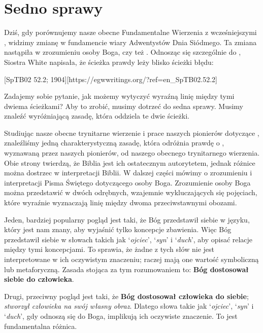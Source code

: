 \chapter{Sedno sprawy}

Dziś, gdy porównujemy nasze obecne Fundamentalne Wierzenia z wcześniejszymi , widzimy zmianę w fundamencie wiary Adwentystów Dnia Siódmego. Ta zmiana nastąpiła w zrozumieniu osoby Boga, czy też . Odnosząc się szczególnie do , Siostra White napisała, że ścieżka prawdy leży blisko ścieżki błędu:

[SpTB02 52.2; 1904][https://egwwritings.org/?ref=en\_SpTB02.52.2]

Zadajemy sobie pytanie, jak możemy wytyczyć wyraźną linię między tymi dwiema ścieżkami? Aby to zrobić, musimy dotrzeć do sedna sprawy. Musimy znaleźć wyróżniającą zasadę, która oddziela te dwie ścieżki.

Studiując nasze obecne trynitarne wierzenie i prace naszych pionierów dotyczące , znaleźliśmy jedną charakterystyczną zasadę, która odróżnia prawdę o , wyznawaną przez naszych pionierów, od naszego obecnego trynitarnego wierzenia. Obie strony twierdzą, że Biblia jest ich ostatecznym autorytetem, jednak różnice można dostrzec w interpretacji Biblii. W dalszej części mówimy o zrozumieniu i interpretacji Pisma Świętego dotyczącego osoby Boga. Zrozumienie osoby Boga można przedstawić w dwóch odrębnych, wzajemnie wykluczających się pojęciach, które wyraźnie wyznaczają linię między dwoma przeciwstawnymi obozami.

Jeden, bardziej popularny pogląd jest taki, że Bóg przedstawił siebie w języku, który jest nam znany, aby wyjaśnić tylko koncepcje zbawienia. Więc Bóg przedstawił siebie w słowach takich jak ‘\textit{ojciec}’, ‘\textit{syn}’ i ‘\textit{duch}’, aby opisać relacje między tymi koncepcjami. To sprawia, że żadne z tych słów nie jest interpretowane w ich oczywistym znaczeniu; raczej mają one wartość symboliczną lub metaforyczną. Zasada stojąca za tym rozumowaniem to: \textbf{Bóg dostosował siebie do człowieka}.

Drugi, przeciwny pogląd jest taki, że \textbf{Bóg dostosował człowieka do siebie}; \textit{stworzył człowieka na swój własny obraz}. Dlatego słowa takie jak ‘\textit{ojciec}’, ‘\textit{syn}’ i ‘\textit{duch}’, gdy odnoszą się do Boga, implikują ich oczywiste znaczenie. To jest fundamentalna różnica.

